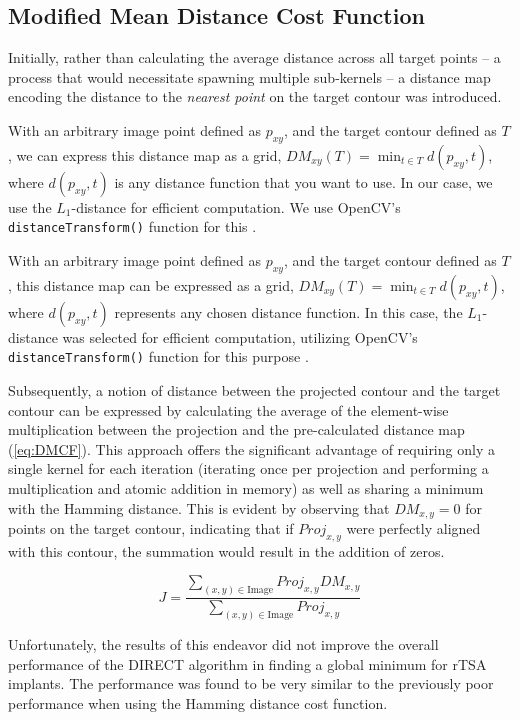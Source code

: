 \subsection{Modified Mean Distance Cost Function}
Initially, rather than calculating the average distance across all target points – a process that would necessitate spawning multiple sub-kernels – a distance map encoding the distance to the \emph{nearest point} on the target contour was introduced.

With an arbitrary image point defined as $p_{xy}$, and the target contour defined as $T$, we can express this distance map as a grid, $\displaystyle DM_{xy}(T) = \min_{t\in T}d(p_{xy},t)$, where $d(p_{xy},t)$ is any distance function that you want to use. In our case, we use the $L_{1}$-distance for efficient computation. We use OpenCV's \texttt{distanceTransform()} function for this \cite{bradskiOpenCVLibrary2000}.

With an arbitrary image point defined as $p_{xy}$, and the target contour defined as $T$, this distance map can be expressed as a grid, $\displaystyle DM_{xy}(T) = \min_{t\in T}d(p_{xy},t)$, where $d(p_{xy},t)$ represents any chosen distance function.
In this case, the $L_{1}$-distance was selected for efficient computation, utilizing OpenCV's \texttt{distanceTransform()} function for this purpose \cite{bradskiOpenCVLibrary2000}.

Subsequently, a notion of distance between the projected contour and the target contour can be expressed by calculating the average of the element-wise multiplication between the projection and the pre-calculated distance map (\cref{eq:DMCF}).
This approach offers the significant advantage of requiring only a single kernel for each iteration (iterating once per projection and performing a multiplication and atomic addition in memory) as well as sharing a minimum with the Hamming distance.
This is evident by observing that $DM_{x,y}=0$ for points on the target contour, indicating that if $Proj_{x,y}$ were perfectly aligned with this contour, the summation would result in the addition of zeros.


\begin{equation}
  \label{eq:DMCF}
  J = \dfrac{ \sum_{(x,y) \in \text{Image}} Proj_{x,y}DM_{x,y} }{\sum_{(x,y)\in \text{Image}}Proj_{x,y}}
\end{equation}

Unfortunately, the results of this endeavor did not improve the overall performance of the DIRECT algorithm in finding a global minimum for rTSA implants.
The performance was found to be very similar to the previously poor performance when using the Hamming distance cost function.

